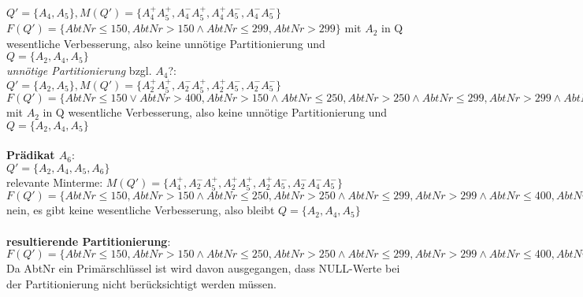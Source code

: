 \documentclass[a4paper]{article}
\begin{document}
$ Q' = \{A_4, A_5 \}, M(Q') = \{ A_4^+ A_5^+, A_4^- A_5^+, A_4^+ A_5^-, A_4^- A_5^- \} $\\
$ F(Q') = \{ AbtNr\leq 150, AbtNr >150 \wedge AbtNr \leq 299, AbtNr > 299\} $
mit $ A_2 $ in Q wesentliche Verbesserung, also keine unnötige Partitionierung und $ Q = \{ A_2, A_4, A_5 \} $\\
\textit{unnötige Partitionierung} bzgl. $ A_4 $?: \\
$ Q' = \{A_2, A_5 \}, M(Q') = \{ A_2^+ A_5^+, A_2^- A_5^+, A_2^+ A_5^-, A_2^- A_5^- \} $\\
$ F(Q') = \{ AbtNr\leq 150 \vee AbtNr > 400, AbtNr >150 \wedge AbtNr \leq 250, AbtNr>250 \wedge AbtNr \leq 299, AbtNr >299 \wedge AbtNr \leq 400\} $
mit $ A_2 $ in Q wesentliche Verbesserung, also keine unnötige Partitionierung und $ Q = \{ A_2, A_4, A_5 \} $\\
\\
\textbf{Prädikat $ A_6 $}:\\
$ Q' = \{ A_2, A_4, A_5, A_6 \} $\\
relevante Minterme: $ M(Q') = \{ A_4^+, A_2^- A_5^+, A_2^+ A_5^+, A_2^+ A_5^-, A_2^- A_4^- A_5^- \} $\\
$ F(Q') = \{ AbtNr\leq 150, AbtNr >150 \wedge AbtNr \leq 250, AbtNr>250 \wedge AbtNr \leq 299, AbtNr >299 \wedge AbtNr \leq 400, AbtNr > 400 \} $\\
nein, es gibt keine wesentliche Verbesserung, also bleibt $ Q = \{ A_2, A_4, A_5 \} $ \\
\\
\textbf{resultierende Partitionierung}:\\
$ F(Q') = \{ AbtNr\leq 150, AbtNr >150 \wedge AbtNr \leq 250, AbtNr>250 \wedge AbtNr \leq 299, AbtNr >299 \wedge AbtNr \leq 400, AbtNr > 400 \} $\\
Da AbtNr ein Primärschlüssel ist wird davon ausgegangen, dass NULL-Werte bei der Partitionierung nicht berücksichtigt werden müssen. 
\end{document}
